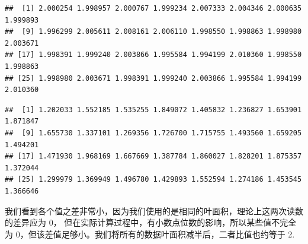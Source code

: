 \documentclass[
]{krantz}
\makeatletter
\newenvironment{Shaded}{\begin{snugshade}}{\end{snugshade}}
\newcommand{\CommentTok}[1]{\textcolor[rgb]{0.56,0.35,0.01}{\textit{#1}}}
\newcommand{\DataTypeTok}[1]{\textcolor[rgb]{0.13,0.29,0.53}{#1}}
\newcommand{\DecValTok}[1]{\textcolor[rgb]{0.00,0.00,0.81}{#1}}
\newcommand{\FloatTok}[1]{\textcolor[rgb]{0.00,0.00,0.81}{#1}}
\newcommand{\KeywordTok}[1]{\textcolor[rgb]{0.13,0.29,0.53}{\textbf{#1}}}
\newcommand{\NormalTok}[1]{#1}
\newcommand{\OperatorTok}[1]{\textcolor[rgb]{0.81,0.36,0.00}{\textbf{#1}}}
\newcommand{\StringTok}[1]{\textcolor[rgb]{0.31,0.60,0.02}{#1}}
\newenvironment{kframe}{%
\medskip{}
\setlength{\fboxsep}{.8em}
 \def\at@end@of@kframe{}%
 \ifinner\ifhmode%
  \def\at@end@of@kframe{\end{minipage}}%
  \begin{minipage}{\columnwidth}%
 \fi\fi%
 \def\FrameCommand##1{\hskip\@totalleftmargin \hskip-\fboxsep
 \colorbox{shadecolor}{##1}\hskip-\fboxsep
     \hskip-\linewidth \hskip-\@totalleftmargin \hskip\columnwidth}%
 \MakeFramed {\advance\hsize-\width
   \@totalleftmargin\z@ \linewidth\hsize
   \@setminipage}}%
 {\par\unskip\endMakeFramed%
 \at@end@of@kframe}
\renewenvironment{Shaded}{\begin{kframe}}{\end{kframe}}
\makeatother
\begin{document}
\begin{Shaded}
\end{Shaded}

\begin{verbatim}
##  [1] 2.000254 1.998957 2.000767 1.999234 2.007333 2.004346 2.000635 1.999893
##  [9] 1.996299 2.005611 2.008161 2.006110 1.998550 1.998863 1.998980 2.003671
## [17] 1.998391 1.999240 2.003866 1.995584 1.994199 2.010360 1.998550 1.998863
## [25] 1.998980 2.003671 1.998391 1.999240 2.003866 1.995584 1.994199 2.010360
\end{verbatim}

\begin{Shaded}
\end{Shaded}

\begin{verbatim}
##  [1] 1.202033 1.552185 1.535255 1.849072 1.405832 1.236827 1.653901 1.871847
##  [9] 1.655730 1.337101 1.269356 1.726700 1.715755 1.493560 1.659205 1.494201
## [17] 1.471930 1.968169 1.667669 1.387784 1.860027 1.828201 1.875357 1.372044
## [25] 1.299979 1.369949 1.496780 1.429893 1.552594 1.274186 1.453545 1.366646
\end{verbatim}

我们看到各个值之差非常小，因为我们使用的是相同的叶面积，理论上这两次读数的差异应为 0， 但在实际计算过程中，有小数点位数的影响，所以某些值不完全为 0，但该差值足够小。我们将所有的数据叶面积减半后，二者比值也约等于 2.
\end{document}
